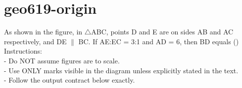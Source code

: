\documentclass[12pt]{article}
\begin{document}
\section*{geo619-origin}
\noindent\begin{minipage}{\textwidth}
\setlength{\parskip}{4pt}
As shown in the figure, in \ensuremath{\triangle }ABC, points D and E are on sides AB and AC respectively, and DE \ensuremath{\parallel } BC. If AE:EC = 3:1 and AD = 6, then BD equals ()\\
Instructions:\\
- Do NOT assume figures are to scale.\\
- Use ONLY marks visible in the diagram unless explicitly stated in the text.\\
- Follow the output contract below exactly.\\
\end{minipage}
\end{document}
